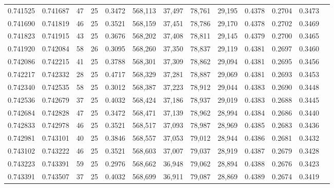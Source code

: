 \begin{tabular}{rrrrrrrrrrrrr}
0.741525 & 0.741687 &    47 &  25 &                                     0.3472 & 568,113 &  37,497 &  78,761 &  29,195 & 0.4378 & 0.2704 & 0.3473 \\
0.741690 & 0.741819 &    46 &  25 &                                     0.3521 & 568,159 &  37,451 &  78,786 &  29,170 & 0.4378 & 0.2702 & 0.3469 \\
0.741823 & 0.741915 &    43 &  25 &                                     0.3676 & 568,202 &  37,408 &  78,811 &  29,145 & 0.4379 & 0.2700 & 0.3465 \\
0.741920 & 0.742084 &    58 &  26 &                                     0.3095 & 568,260 &  37,350 &  78,837 &  29,119 & 0.4381 & 0.2697 & 0.3460 \\
0.742086 & 0.742215 &    41 &  25 &                                     0.3788 & 568,301 &  37,309 &  78,862 &  29,094 & 0.4381 & 0.2695 & 0.3456 \\
0.742217 & 0.742332 &    28 &  25 &                                     0.4717 & 568,329 &  37,281 &  78,887 &  29,069 & 0.4381 & 0.2693 & 0.3453 \\
0.742340 & 0.742535 &    58 &  25 &                                     0.3012 & 568,387 &  37,223 &  78,912 &  29,044 & 0.4383 & 0.2690 & 0.3448 \\
0.742536 & 0.742679 &    37 &  25 &                                     0.4032 & 568,424 &  37,186 &  78,937 &  29,019 & 0.4383 & 0.2688 & 0.3445 \\
0.742684 & 0.742828 &    47 &  25 &                                     0.3472 & 568,471 &  37,139 &  78,962 &  28,994 & 0.4384 & 0.2686 & 0.3440 \\
0.742833 & 0.742978 &    46 &  25 &                                     0.3521 & 568,517 &  37,093 &  78,987 &  28,969 & 0.4385 & 0.2683 & 0.3436 \\
0.742981 & 0.743101 &    40 &  25 &                                     0.3846 & 568,557 &  37,053 &  79,012 &  28,944 & 0.4386 & 0.2681 & 0.3432 \\
0.743102 & 0.743222 &    46 &  25 &                                     0.3521 & 568,603 &  37,007 &  79,037 &  28,919 & 0.4387 & 0.2679 & 0.3428 \\
0.743223 & 0.743391 &    59 &  25 &                                     0.2976 & 568,662 &  36,948 &  79,062 &  28,894 & 0.4388 & 0.2676 & 0.3423 \\
0.743391 & 0.743507 &    37 &  25 &                                     0.4032 & 568,699 &  36,911 &  79,087 &  28,869 & 0.4389 & 0.2674 & 0.3419 \\

\end{tabular}
